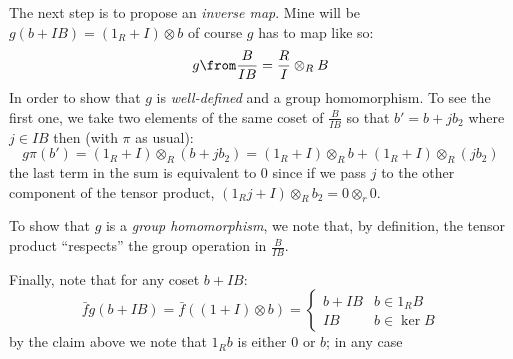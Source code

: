 \begin{description}
\begin{enumerate}[(a)]
            The next step is to propose an \emph{inverse map}. Mine will be $g(b+IB) = (1_R+I)\otimes b$ of course $g$ has to map like so:
            $$g\from \frac B{IB} = \frac RI\otimes_R B$$
            In order to show that $g$ is \emph{well-defined} and a group homomorphism. To see the first one, we take two elements of the same coset of $\frac B{IB}$ so that $b'=b+jb_2$ where $j\in IB$ then (with $\pi$ as usual):
            $$g\pi(b') = (1_R+I)\otimes_R (b+jb_2) = (1_R+I)\otimes_R b +(1_R+I)\otimes_R(jb_2)$$
            the last term in the sum is equivalent to 0 since if we pass $j$ to the other component of the tensor product, $(1_Rj+I)\otimes_R b_2=0\otimes_r 0$.

            To show that $g$ is a \emph{group homomorphism}, we note that, by definition, the tensor product ``respects'' the group operation in $\frac B{IB}$.

            Finally, note that for any coset $b+IB$:
            $$\bar f g(b+IB)=\bar f((1+I)\otimes b)=\begin{cases}
                b+IB & b\in 1_RB\\ 
                IB & b \in \ker B
            \end{cases}$$
            by the claim above we note that $1_Rb$ is either 0 or $b$; in any case 
    \end{enumerate}
\end{description}
